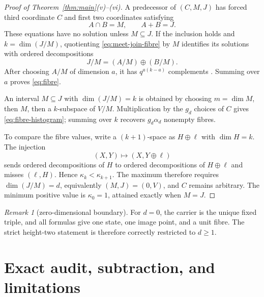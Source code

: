 \documentclass[a4paper,10pt]{amsart}
\theoremstyle{remark}
\newtheorem{remark}[theorem]{Remark}
\newcommand{\meet}{\mathbin{\cap}}
\newcommand{\join}{\mathbin{+}}
\begin{document}
\begin{proof}[Proof of Theorem~\ref{thm:main}(v)--(vi)]
A predecessor of $(C,M,J)$ has forced third coordinate $C$ and first two
coordinates satisfying
\begin{equation}\label{eq:meet-join-fibre}
                 A\meet B=M,\qquad A\join B=J.
\end{equation}
These equations have no solution unless $M\subseteq J$.  If the inclusion
holds and $k=\dim(J/M)$, quotienting \eqref{eq:meet-join-fibre} by $M$
identifies its solutions with ordered decompositions
\[
                 J/M=(A/M)\oplus(B/M).
\]
After choosing $A/M$ of dimension $a$, it has $q^{a(k-a)}$ complements
\cite{ChajdaLanger2019}.  Summing over $a$ proves \eqref{eq:fibre}.

An interval $M\subseteq J$ with $\dim(J/M)=k$ is obtained by choosing
$m=\dim M$, then $M$, then a $k$-subspace of $V/M$.  Multiplication by the
$g_d$ choices of $C$ gives \eqref{eq:fibre-histogram}; summing over $k$
recovers $g_d\alpha_d$ nonempty fibres.

To compare the fibre values, write a $(k+1)$-space as $H\oplus\ell$ with
$\dim H=k$.  The injection
\[
        (X,Y)\longmapsto (X,Y\oplus\ell)
\]
sends ordered decompositions of $H$ to ordered decompositions of
$H\oplus\ell$ and misses $(\ell,H)$.  Hence
$\kappa_k<\kappa_{k+1}$.  The maximum therefore requires
$\dim(J/M)=d$, equivalently $(M,J)=(0,V)$, and $C$ remains arbitrary.  The
minimum positive value is $\kappa_0=1$, attained exactly when $M=J$.
\end{proof}

\begin{remark}[zero-dimensional boundary]
For $d=0$, the carrier is the unique fixed triple, and all formulas give one
state, one image point, and a unit fibre.  The strict height-two statement is
therefore correctly restricted to $d\ge1$.
\end{remark}

\section{Exact audit, subtraction, and limitations}
\end{document}
